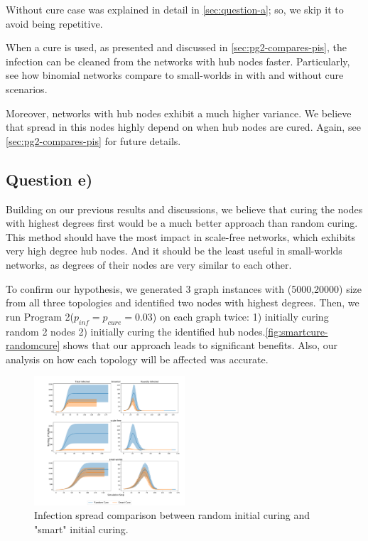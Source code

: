 \documentclass[conference]{IEEEtran}
\begin{document}
Without cure case was explained in detail in \autoref{sec:question-a}; so, we skip it to avoid being repetitive.

When a cure is used, as presented and discussed in \autoref{sec:pg2-compares-pis}, the infection can be cleaned from the networks with hub nodes faster. Particularly, see how binomial networks compare to small-worlds in with and without cure scenarios.

Moreover, networks with hub nodes exhibit a much higher variance. We believe that spread in this nodes highly depend on when hub nodes are cured. Again, see \autoref{sec:pg2-compares-pis} for future details.

\subsection{Question e)}

Building on our previous results and discussions, we believe that curing the nodes with highest degrees first would be a much better approach than random curing. This method should have the most impact in scale-free networks, which exhibits very high degree hub nodes. And it should be the least useful in small-worlds networks, as degrees of their nodes are very similar to each other.

To confirm our hypothesis, we generated 3 graph instances with (5000,20000) size from all three topologies and identified two nodes with highest degrees. Then, we run Program 2($p_{inf} = p_{cure} = 0.03$) on each graph twice: 1) initially curing random 2 nodes 2) initially curing the identified hub nodes.\autoref{fig:smartcure-randomcure} shows that our approach leads to significant benefits. Also, our analysis on how each topology will be affected was accurate.

\begin{figure}[htb]
  \begin{center}
	\includegraphics[width=0.5\textwidth]{img/smartcure-randomcure.pdf}
  \end{center}
	\caption{Infection spread comparison between random initial curing and "smart" initial curing.}
	\label{fig:smartcure-randomcure}
\end{figure}
\end{document}
